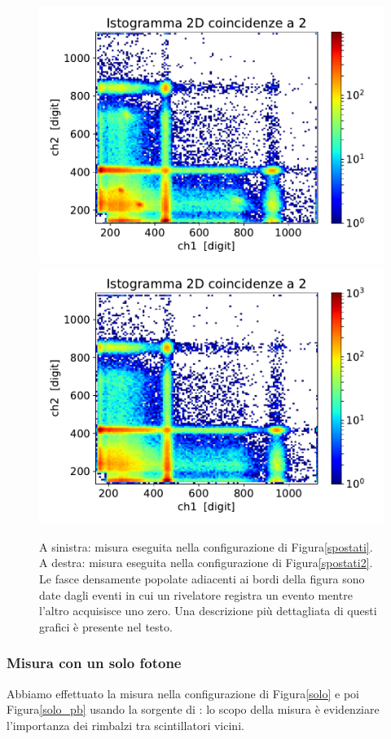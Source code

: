 \begin{figure}[h]
\centering
\hspace{-2.5 cm}
\subfloat
{
\includegraphics[width=21 em]{immagini/0518_rimbalzi}
\label{spostato}
}
\subfloat
{
\includegraphics[width=21 em]{immagini/0518_piombo}
\label{piombo}
}
\caption{A sinistra: misura eseguita nella configurazione di Figura\autoref{spostati}. \\
A destra: misura eseguita nella configurazione di Figura\autoref{spostati2}.  \\
Le fasce densamente popolate adiacenti ai bordi della figura sono date dagli eventi in cui un rivelatore registra un evento mentre l'altro acquisisce uno zero.
Una descrizione più dettagliata di questi grafici è presente nel testo.}

\end{figure}

\subsubsection{Misura con un solo fotone}

Abbiamo effettuato la misura nella configurazione di Figura\autoref{solo} e poi Figura\autoref{solo_pb} usando la sorgente di \cs{}: lo scopo della misura è evidenziare l'importanza dei rimbalzi tra scintillatori vicini.

